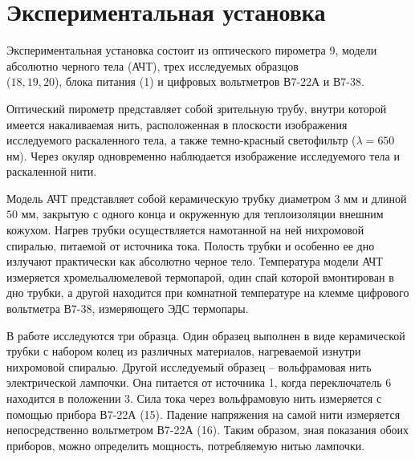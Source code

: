 \section{Экспериментальная установка}

    Экспериментальная установка состоит из оптического пирометра 9, модели абсолютно черного тела (АЧТ), трех исследуемых
    образцов \\ ($18, 19, 20$), блока питания (1) и цифровых вольтметров В7-22А и В7-38.

    Оптический пирометр представляет собой зрительную трубу, внутри которой имеется накаливаемая нить, расположенная в плоскости
    изображения исследуемого раскаленного тела, а также темно-красный светофильтр ($\lambda = 650$ нм). Через окуляр одновременно наблюдается
    изображение исследуемого тела и раскаленной нити.

    Модель АЧТ представляет собой керамическую трубку диаметром
    $3$ мм и длиной $50$ мм, закрытую с одного конца и окруженную для
    теплоизоляции внешним кожухом. Нагрев трубки осуществляется намотанной на ней нихромовой спиралью, питаемой от источника тока.
    Полость трубки и особенно ее дно излучают практически как абсолютно черное тело. Температура модели АЧТ измеряется хромельалюмелевой термопарой, один спай которой вмонтирован в дно трубки, а другой находится при комнатной температуре на клемме цифрового вольтметра В7-38, измеряющего ЭДС термопары.

    В работе исследуются три образца. Один образец выполнен в виде керамической трубки с набором колец из различных материалов,
    нагреваемой изнутри нихромовой спиралью. Другой исследуемый образец -- вольфрамовая нить электрической
    лампочки. Она питается от источника 1, когда переключатель 6 находится в положении 3. Сила тока через вольфрамовую нить измеряется
    с помощью прибора В7-22А (15). Падение напряжения на самой нити измеряется непосредственно вольтметром В7-22А (16). Таким образом,
    зная показания обоих приборов, можно определить мощность, потребляемую нитью лампочки.

